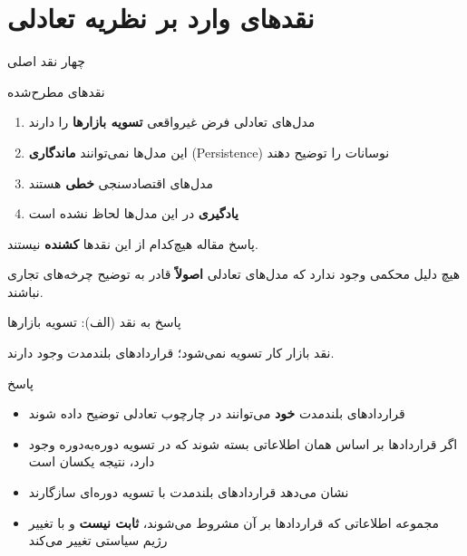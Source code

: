 \documentclass[aspectratio=169,11pt]{beamer}
\newcommand{\highlight}[1]{\textcolor{AccentOrange}{\textbf{#1}}}
\newcommand{\important}[1]{\textcolor{AlertRed}{\textbf{#1}}}
\begin{document}
\section{نقدهای وارد بر نظریه تعادلی}

\begin{frame}{چهار نقد اصلی}
	\begin{block}{نقدهای مطرح‌شده}
		\begin{enumerate}
			\item[(الف)] مدل‌های تعادلی فرض غیرواقعی \highlight{تسویه بازارها} را دارند
			\item[(ب)] این مدل‌ها نمی‌توانند \highlight{ماندگاری} (Persistence) نوسانات را توضیح دهند
			\item[(ج)] مدل‌های اقتصادسنجی \highlight{خطی} هستند
			\item[(د)] \highlight{یادگیری} در این مدل‌ها لحاظ نشده است
		\end{enumerate}
	\end{block}
	\vspace{0.3cm}
	\begin{exampleblock}{پاسخ مقاله}
		\centering
		هیچ‌کدام از این نقدها \important{کشنده} نیستند.
		\vspace{0.2cm}

		هیچ دلیل محکمی وجود ندارد که مدل‌های تعادلی \important{اصولاً} قادر به توضیح چرخه‌های تجاری نباشند.
	\end{exampleblock}
\end{frame}

\begin{frame}{پاسخ به نقد (الف): تسویه بازارها}
	\begin{alertblock}{نقد}
		\centering
		بازار کار تسویه نمی‌شود؛ قراردادهای بلندمدت وجود دارند.
	\end{alertblock}
	\vspace{0.3cm}
	\begin{exampleblock}{پاسخ}
		\begin{itemize}
			\item قراردادهای بلندمدت \important{خود} می‌توانند در چارچوب تعادلی توضیح داده شوند
			\item اگر قراردادها بر اساس همان اطلاعاتی بسته شوند که در تسویه دوره‌به‌دوره وجود دارد، نتیجه یکسان است
			\item {} نشان می‌دهد قراردادهای بلندمدت با تسویه دوره‌ای سازگارند
			\item مجموعه اطلاعاتی که قراردادها بر آن مشروط می‌شوند، \highlight{ثابت نیست} و با تغییر رژیم سیاستی تغییر می‌کند
		\end{itemize}
	\end{exampleblock}
\end{frame}
\end{document}
